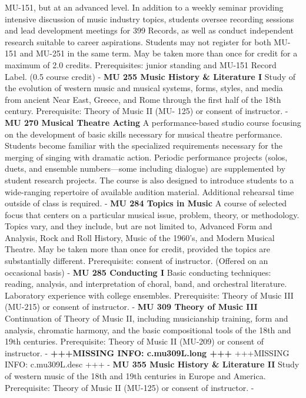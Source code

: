 \documentclass[
  letterpaper,
]{scrbook}
\begin{document}
MU-151, but at an advanced level. In addition to a weekly seminar
providing intensive discussion of music industry topics, students
oversee recording sessions and lead development meetings for 399
Records, as well as conduct independent research suitable to career
aspirations. Students may not register for both MU-151 and MU-251 in the
same term. May be taken more than once for credit for a maximum of 2.0
credits. Prerequisites: junior standing and MU-151 Record Label. (0.5
course credit) - \textbf{MU 255 Music History \& Literature I} Study of
the evolution of western music and musical systems, forms, styles, and
media from ancient Near East, Greece, and Rome through the first half of
the 18th century. Prerequisite: Theory of Music II (MU- 125) or consent
of instructor. - \textbf{MU 270 Musical Theatre Acting} A
performance-based studio course focusing on the development of basic
skills necessary for musical theatre performance. Students become
familiar with the specialized requirements necessary for the merging of
singing with dramatic action. Periodic performance projects (solos,
duets, and ensemble numbers---some including dialogue) are supplemented
by student research projects. The course is also designed to introduce
students to a wide-ranging repertoire of available audition material.
Additional rehearsal time outside of class is required. - \textbf{MU 284
Topics in Music} A course of selected focus that centers on a particular
musical issue, problem, theory, or methodology. Topics vary, and they
include, but are not limited to, Advanced Form and Analysis, Rock and
Roll History, Music of the 1960's, and Modern Musical Theatre. May be
taken more than once for credit, provided the topics are substantially
different. Prerequisite: consent of instructor. (Offered on an
occasional basis) - \textbf{MU 285 Conducting I} Basic conducting
techniques: reading, analysis, and interpretation of choral, band, and
orchestral literature. Laboratory experience with college ensembles.
Prerequisite: Theory of Music III (MU-215) or consent of instructor. -
\textbf{MU 309 Theory of Music III} Continuation of Theory of Music II,
including musicianship training, form and analysis, chromatic harmony,
and the basic compositional tools of the 18th and 19th centuries.
Prerequisite: Theory of Music II (MU-209) or consent of instructor. -
\textbf{+++MISSING INFO: c.mu309L.long +++} +++MISSING INFO:
c.mu309L.desc +++ - \textbf{MU 355 Music History \& Literature II} Study
of western music of the 18th and 19th centuries in Europe and America.
Prerequisite: Theory of Music II (MU-125) or consent of instructor. -
\end{document}
